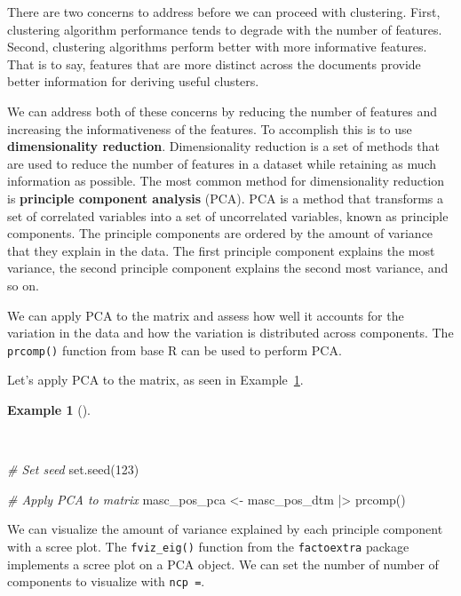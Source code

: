 \documentclass[
  letterpaper,
]{latex/krantz}
\newenvironment{Shaded}{\begin{snugshade}}{\end{snugshade}}
\newcommand{\CommentTok}[1]{\textcolor[rgb]{0.00,0.00,0.00}{\textit{#1}}}
\newcommand{\DecValTok}[1]{\textcolor[rgb]{0.00,0.00,0.00}{#1}}
\newcommand{\FunctionTok}[1]{\textcolor[rgb]{0.00,0.00,0.00}{#1}}
\newcommand{\NormalTok}[1]{\textcolor[rgb]{0.00,0.00,0.00}{#1}}
\newcommand{\OtherTok}[1]{\textcolor[rgb]{0.00,0.00,0.00}{#1}}
\newcommand{\SpecialCharTok}[1]{\textcolor[rgb]{0.00,0.00,0.00}{#1}}
\theoremstyle{definition}
\newtheorem{example}{Example}[chapter]
\theoremstyle{remark}
\begin{document}
There are two concerns to address before we can proceed with clustering.
First, clustering algorithm performance tends to degrade with the number
of features. Second, clustering algorithms perform better with more
informative features. That is to say, features that are more distinct
across the documents provide better information for deriving useful
clusters.

We can address both of these concerns by reducing the number of features
and increasing the informativeness of the features. To accomplish this
is to use \textbf{dimensionality reduction}. Dimensionality reduction is
a set of methods that are used to reduce the number of features in a
dataset while retaining as much information as possible. The most common
method for dimensionality reduction is \textbf{principle component
analysis} (PCA). PCA is a method that transforms a set of correlated
variables into a set of uncorrelated variables, known as principle
components. The principle components are ordered by the amount of
variance that they explain in the data. The first principle component
explains the most variance, the second principle component explains the
second most variance, and so on.

We can apply PCA to the matrix and assess how well it accounts for the
variation in the data and how the variation is distributed across
components. The \texttt{prcomp()} function from base R can be used to
perform PCA.

Let's apply PCA to the matrix, as seen in
Example~\ref{exm-eda-masc-dtms-pca}.

\begin{example}[]\protect\hypertarget{exm-eda-masc-dtms-pca}{}\label{exm-eda-masc-dtms-pca}

~

\begin{Shaded}
\begin{Highlighting}[]
\CommentTok{\# Set seed}
\FunctionTok{set.seed}\NormalTok{(}\DecValTok{123}\NormalTok{)}

\CommentTok{\# Apply PCA to matrix}
\NormalTok{masc\_pos\_pca }\OtherTok{\textless{}{-}}
\NormalTok{  masc\_pos\_dtm }\SpecialCharTok{|\textgreater{}}
  \FunctionTok{prcomp}\NormalTok{()}
\end{Highlighting}
\end{Shaded}

\end{example}

We can visualize the amount of variance explained by each principle
component with a scree plot. The \texttt{fviz\_eig()} function from the
\texttt{factoextra} package implements a scree plot on a PCA object. We
can set the number of number of components to visualize with
\texttt{ncp\ =}.
\end{document}
